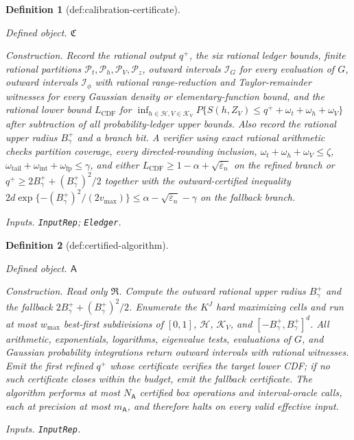 \documentclass{article}
\newtheorem{definition}{Definition}
\begin{document}
\begin{definition}[def:calibration-certificate]\label{def:calibration-certificate}
\par\smallskip\noindent\emph{Defined object.} \(\mathfrak C\)
\par\smallskip\noindent\emph{Construction.} Record the rational output \(q^+\), the six rational ledger bounds, finite rational partitions \(\mathcal P_t,\mathcal P_h,\mathcal P_V,\mathcal P_z\), outward intervals \(\mathcal I_G\) for every evaluation of \(G\), outward intervals \(\mathcal I_\phi\) with rational range-reduction and Taylor-remainder witnesses for every Gaussian density or elementary-function bound, and the rational lower bound \(L_{\mathrm{CDF}}\) for \(\inf_{h\in\mathcal H,V\in\mathcal K_V}P\{S(h,Z_V)\le q^++\omega_t+\omega_h+\omega_V\}\) after subtraction of all probability-ledger upper bounds. Also record the rational upper radius \(B_\gamma^+\) and a branch bit. A verifier using exact rational arithmetic checks partition coverage, every directed-rounding inclusion, \(\omega_t+\omega_h+\omega_V\le\zeta\), \(\omega_{\mathrm{tail}}+\omega_{\mathrm{int}}+\omega_{\mathrm{fp}}\le\gamma\), and either \(L_{\mathrm{CDF}}\ge1-\alpha+\sqrt{\overline\varepsilon_n}\) on the refined branch or \(q^+\ge2B_\gamma^++(B_\gamma^+)^2/2\) together with the outward-certified inequality \(2d\exp\{-(B_\gamma^+)^2/(2v_{\max})\}\le\alpha-\sqrt{\overline\varepsilon_n}-\gamma\) on the fallback branch.
\par\smallskip\noindent\emph{Inputs.} \texttt{InputRep}; \texttt{Eledger}.
\end{definition}

\begin{definition}[def:certified-algorithm]\label{def:certified-algorithm}
\par\smallskip\noindent\emph{Defined object.} \(\mathsf A\)
\par\smallskip\noindent\emph{Construction.} Read only \(\mathfrak R\). Compute the outward rational upper radius \(B_\gamma^+\) and the fallback \(2B_\gamma^++(B_\gamma^+)^2/2\). Enumerate the \(K^J\) hard maximizing cells and run at most \(w_{\max}\) best-first subdivisions of \([0,1]\), \(\mathcal H\), \(\mathcal K_V\), and \([-B_\gamma^+,B_\gamma^+]^d\). All arithmetic, exponentials, logarithms, eigenvalue tests, evaluations of \(G\), and Gaussian probability integrations return outward intervals with rational witnesses. Emit the first refined \(q^+\) whose certificate verifies the target lower CDF; if no such certificate closes within the budget, emit the fallback certificate. The algorithm performs at most \(N_{\mathsf A}\) certified box operations and interval-oracle calls, each at precision at most \(m_{\mathsf A}\), and therefore halts on every valid effective input.
\par\smallskip\noindent\emph{Inputs.} \texttt{InputRep}.
\end{definition}
\end{document}
